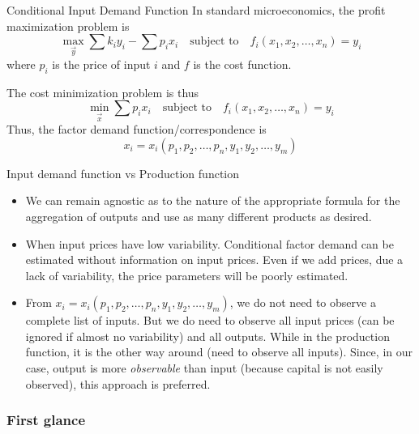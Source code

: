 \documentclass[10pt,mathserif,aspectratio=169]{beamer}
\begin{document}
\begin{frame}[label=inputdemand]{Conditional Input Demand Function}
  In standard microeconomics, the profit maximization problem is
  \begin{equation*}
    \max_{\vec{y}} \sum k_i y_i - \sum p_i x_i \quad \text{subject to} \quad f_i(x_1, x_2, \ldots, x_n) = y_i
  \end{equation*}
  where $p_i$ is the price of input $i$ and $f$ is the cost function.

  The cost minimization problem is thus
  \begin{equation*}
    \min_{\vec{x}} \sum p_i x_i \quad \text{subject to} \quad f_i(x_1, x_2, \ldots, x_n) = y_i
  \end{equation*}
  Thus, the factor demand function/correspondence is
  \begin{equation*}
    x_i = x_i(p_1, p_2, \ldots, p_n, y_1, y_2, \ldots, y_m)
  \end{equation*}
  \hyperlink{literature}{}
\end{frame}

\begin{frame}[label=production]{Input demand function vs Production function}
  \begin{itemize}
    \item We can remain agnostic as to the nature of the appropriate formula for the
          aggregation of outputs and use as many different products as desired.
    \item When input prices have low variability. Conditional factor demand can be
          estimated without information on input prices. Even if we add prices, due a
          lack of variability, the price parameters will be poorly estimated.

    \item From $x_i = x_i(p_1, p_2, \ldots, p_n, y_1, y_2, \ldots, y_m)$, we do not need
          to observe a complete list of inputs. But we do need to observe all input
          prices (can be ignored if almost no variability) and all outputs. While in the
          production function, it is the other way around (need to observe all inputs).
          Since, in our case, output is more \textit{observable} than input (because
          capital is not easily observed), this approach is preferred.
  \end{itemize}
\end{frame}

\begin{frame}
  \frametitle{First glance}
  \begin{columns}[T,T]
    \makebox[\textwidth][c]{
      \fontsize{5pt}{5pt} \selectfont
      }

    \makebox[\textwidth][c]{
      \fontsize{5pt}{5pt} \selectfont
      }

  \end{columns}
\end{frame}
\end{document}
